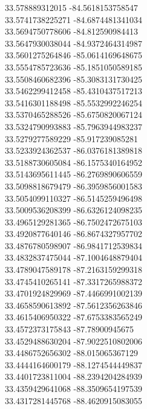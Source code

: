{33.578889312015	-84.5618153758547\\
33.5741738225271	-84.6874481341034\\
33.5694750778606	-84.812590984413\\
33.5647930038044	-84.9372464314987\\
33.5601275264846	-85.0614169648675\\
33.5554785723636	-85.1851050589185\\
33.5508460682396	-85.3083131730425\\
33.5462299412458	-85.4310437517213\\
33.5416301188498	-85.5532992246254\\
33.5370465288526	-85.6750820067124\\
33.5324790993883	-85.7963944983237\\
33.5279277589229	-85.917239085281\\
33.5233924362537	-86.0376181389818\\
33.5188730605084	-86.1575340164952\\
33.5143695611445	-86.2769890606559\\
33.5098818679479	-86.3959856001583\\
33.5054099110327	-86.5145259496498\\
33.5009536208399	-86.6326124098235\\
33.4965129281365	-86.7502472675103\\
33.4920877640146	-86.8674327957702\\
33.4876780598907	-86.9841712539834\\
33.4832837475044	-87.1004648879404\\
33.4789047589178	-87.2163159299318\\
33.4745410265141	-87.3317265988372\\
33.4701924829969	-87.4466991002139\\
33.4658590613892	-87.5612356263846\\
33.4615406950322	-87.6753383565249\\
33.4572373175843	-87.78900945675\\
33.4529488630204	-87.9022510802006\\
33.4486752656302	-88.015065367129\\
33.4444164600179	-88.1274544449837\\
33.4401723811004	-88.2394204284939\\
33.4359429641068	-88.3509654197539\\
33.4317281445768	-88.4620915083055\\
}
